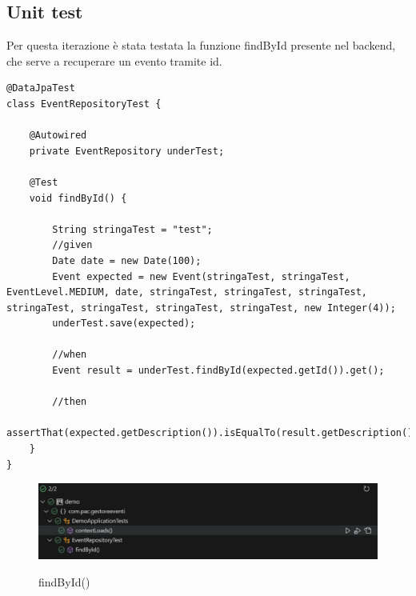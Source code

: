 \subsection{Unit test}
Per questa iterazione è stata testata la funzione findById presente nel backend, che serve a recuperare un evento tramite id.

\begin{lstlisting}
@DataJpaTest
class EventRepositoryTest {

	@Autowired
	private EventRepository underTest;
	
	@Test
	void findById() {
			
		String stringaTest = "test";
		//given
		Date date = new Date(100);
		Event expected = new Event(stringaTest, stringaTest, EventLevel.MEDIUM, date, stringaTest, stringaTest, stringaTest, stringaTest, stringaTest, stringaTest, stringaTest, new Integer(4));
		underTest.save(expected);
		
		//when
		Event result = underTest.findById(expected.getId()).get();
		
		//then
		assertThat(expected.getDescription()).isEqualTo(result.getDescription());
	}
}
\end{lstlisting}

\begin{figure}[h!]
\begin{center}

  \includegraphics[width=16cm]{test/unit test/unit.PNG}\\
  \caption{findById()}
\end{center}
\end{figure}